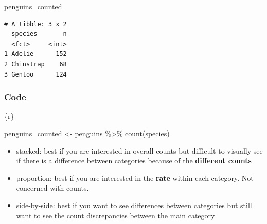 \documentclass[
  letterpaper,
  DIV=11,
  numbers=noendperiod]{scrreprt}
\newenvironment{Shaded}{\begin{snugshade}}{\end{snugshade}}
\newcommand{\FunctionTok}[1]{\textcolor[rgb]{0.28,0.35,0.67}{#1}}
\newcommand{\InformationTok}[1]{\textcolor[rgb]{0.37,0.37,0.37}{#1}}
\newcommand{\NormalTok}[1]{\textcolor[rgb]{0.00,0.23,0.31}{#1}}
\newcommand{\OtherTok}[1]{\textcolor[rgb]{0.00,0.23,0.31}{#1}}
\newcommand{\SpecialCharTok}[1]{\textcolor[rgb]{0.37,0.37,0.37}{#1}}
\providecommand{\tightlist}{%
  \setlength{\itemsep}{0pt}\setlength{\parskip}{0pt}}\usepackage{longtable,booktabs,array}
\begin{document}
\begin{tcolorbox}[enhanced jigsaw, breakable, colback=white, bottomrule=.15mm, leftrule=.75mm, colframe=quarto-callout-note-color-frame, arc=.35mm, rightrule=.15mm, toprule=.15mm, left=2mm, opacityback=0]
\begin{Shaded}
\begin{Highlighting}[]
\NormalTok{penguins\_counted}
\InformationTok{\textasciigrave{}\textasciigrave{}\textasciigrave{}}
\end{Highlighting}
\end{Shaded}

\begin{verbatim}
# A tibble: 3 x 2
  species       n
  <fct>     <int>
1 Adelie      152
2 Chinstrap    68
3 Gentoo      124
\end{verbatim}

\hypertarget{code}{%
\subsubsection*{Code}\label{code}}

\begin{Shaded}
\begin{Highlighting}[]
\InformationTok{\textasciigrave{}\textasciigrave{}\textasciigrave{}\{r\}}

\NormalTok{penguins\_counted }\OtherTok{\textless{}{-}}\NormalTok{ penguins }\SpecialCharTok{\%\textgreater{}\%} 
  \FunctionTok{count}\NormalTok{(species)}
\InformationTok{\textasciigrave{}\textasciigrave{}\textasciigrave{}}
\end{Highlighting}
\end{Shaded}

\end{tcolorbox}

\begin{tcolorbox}[enhanced jigsaw, toptitle=1mm, colback=white, arc=.35mm, rightrule=.15mm, titlerule=0mm, left=2mm, breakable, bottomtitle=1mm, bottomrule=.15mm, leftrule=.75mm, title={Teaching note:}, colframe=quarto-callout-important-color-frame, opacitybacktitle=0.6, toprule=.15mm, colbacktitle=quarto-callout-important-color!10!white, coltitle=black, opacityback=0]

\begin{itemize}
\tightlist
\item
  stacked: best if you are interested in overall counts but difficult to
  visually see if there is a difference between categories because of
  the \textbf{different counts}
\item
  proportion: best if you are interested in the \textbf{rate} within
  each category. Not concerned with counts.
\item
  side-by-side: best if you want to see differences between categories
  but still want to see the count discrepancies between the main
  category
\end{itemize}

\end{tcolorbox}
\end{document}
